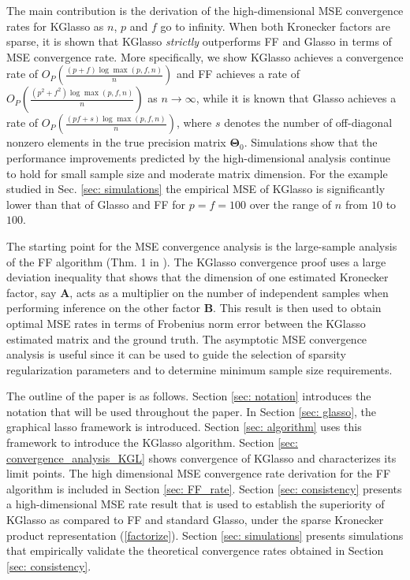 \documentclass[journal,11pt,draftcls,onecolumn]{IEEEtran}
\def\bA{ {\mathbf{A}} }
\def\bB{ {\mathbf{B}} }
\def\bTheta{ {\mathbf{\Theta}} }
\begin{document}
%
The main contribution is the derivation of the high-dimensional MSE convergence rates for KGlasso as $n$, $p$ and $f$ go to infinity.
 When both Kronecker factors are sparse, it is shown that KGlasso \textit{strictly} outperforms FF and Glasso in terms of MSE convergence rate. More specifically, we show KGlasso achieves a convergence rate of $O_P\left(\frac{(p+f)\log \max(p,f,n)}{n}\right)$ and FF achieves a rate of $O_P\left(\frac{(p^2+f^2)\log \max(p,f,n)}{n}\right)$ as $n\to\infty$, while it is known \cite{Rothman, TimeVaryingGraphs} that Glasso achieves a rate of $O_P\left(\frac{(pf+s)\log \max(p,f,n)}{n}\right)$, where $s$ denotes the number of off-diagonal nonzero elements in the true precision matrix $\bTheta_0$. Simulations show that the performance improvements predicted by the high-dimensional analysis continue to hold for small sample size and moderate matrix dimension. For the example studied in Sec. \ref{sec: simulations} the empirical MSE of KGlasso is significantly lower than that of Glasso and FF for $p=f=100$ over the range of $n$  from $10$ to $100$.


The starting point for the MSE convergence analysis is the large-sample analysis of the FF algorithm (Thm. 1 in \cite{EstCovMatKron}). The KGlasso convergence proof uses a large deviation inequality  that shows that the dimension of one estimated Kronecker factor, say $\bA$, acts as a multiplier on the number of independent samples when performing inference on the other factor $\bB$. This result is then used to obtain optimal MSE rates in terms of Frobenius norm error between the KGlasso estimated matrix and the ground truth. The asymptotic MSE convergence analysis is useful since it can be used to guide the selection of sparsity regularization parameters and to determine minimum sample size requirements.

The outline of the paper is as follows. Section \ref{sec: notation} introduces the notation that will be used throughout the paper. In Section \ref{sec: glasso}, the graphical lasso framework is introduced. Section \ref{sec: algorithm} uses this framework to introduce the KGlasso algorithm. Section \ref{sec: convergence_analysis_KGL} shows convergence of KGlasso and characterizes its limit points. The high dimensional MSE convergence rate derivation for the FF algorithm is included in Section \ref{sec: FF_rate}. Section \ref{sec: consistency} presents a high-dimensional MSE rate result that is used to establish the superiority of KGlasso as compared to FF and standard Glasso, under the sparse Kronecker product representation (\ref{factorize}). Section \ref{sec: simulations} presents simulations that empirically validate the theoretical convergence rates obtained in Section \ref{sec: consistency}.
\end{document}
